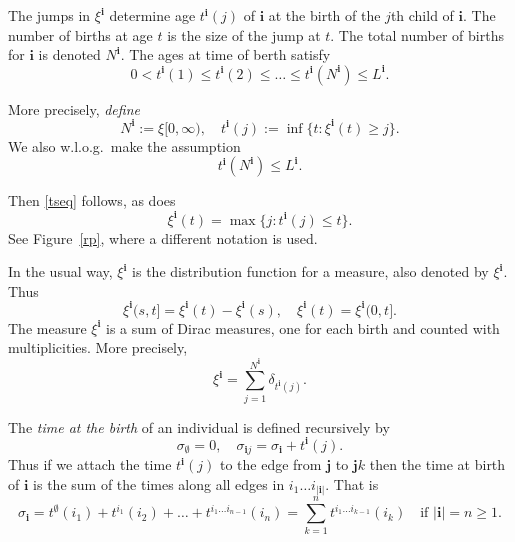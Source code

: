 \documentclass[a4paper]{amsart}
\theoremstyle{plain}
\theoremstyle{definition}
\theoremstyle{remark}
\begin{document}
The jumps in $ \xi ^ {\boldsymbol{i} } $ determine age $ t^{ \boldsymbol{i} }(j) $ of $ \boldsymbol{i} $ at the birth of   the $ j $th child of $ \boldsymbol{i} $. The number of births at age  $ t $ is the  size of the jump at $ t $. The  total number of births  for $ \boldsymbol{i} $ is denoted $ N^{ \boldsymbol{i} }$.  The   ages at time of berth  satisfy 
\begin{equation} \label{tseq}  
0 < t^{ \boldsymbol{i} }(1) \leq t^{ \boldsymbol{i} }(2) \leq \dots \leq  t^{ \boldsymbol{i} }(N^{ \boldsymbol{i} })\leq L^{ \boldsymbol{i} } .
\end{equation} 

More precisely,    \emph{define}
\begin{equation} \label{} 
N^{ \boldsymbol{i} } := \xi [0,\infty), \quad t^{ \boldsymbol{i} } (j) := \inf \{ t : \xi^ {\boldsymbol{i}  } (t) \geq j \}.
\end{equation} 
We also  w.l.o.g.\ make the assumption
\begin{equation} \label{} 
 t^{ \boldsymbol{i} }(N^{ \boldsymbol{i} }) \leq L^{ \boldsymbol{i} } .
\end{equation} 

Then \eqref{tseq} follows, as does
\begin{equation} \label{} 
\xi ^{ \boldsymbol{i} } (t) = \max \big\{ j : t^{ \boldsymbol{i} } (j) \leq t \big\}.
\end{equation} 
See Figure~\ref{rp}, where    a different notation is used.  

 
 In the usual way, $   \xi ^ { \boldsymbol{i}  } $  is the distribution function for a measure, also denoted by $    \xi ^ { \boldsymbol{i}  } $. 
Thus
\[
\xi ^ { \boldsymbol{i} } (s,t] = \xi ^ { \boldsymbol{i} } (t) - \xi ^ { \boldsymbol{i} } (s) ,  \quad \xi ^ { \boldsymbol{i} } (t) =  \xi ^ { \boldsymbol{i} } (0,t] .
\]
The measure $ \xi^ { \boldsymbol{i} } $ is a sum of Dirac measures, one for each birth and counted with multiplicities.  More precisely,
\begin{equation} \label{} 
\xi ^ { \boldsymbol{i} } = \sum_{j=1}^{ N^ { \boldsymbol{i} }} \delta _{ t^{ \boldsymbol{i} } (j) }.
\end{equation} 

\medskip The \emph{time  at the birth} of an individual is defined recursively by
\begin{equation} \label{} 
\sigma_{ \emptyset} = 0, \quad \sigma_{ \boldsymbol{i} j }  = \sigma _{ \boldsymbol{i} } + t^{ \boldsymbol{i} } (j).
\end{equation} 
Thus if we attach the time $ t^{ \boldsymbol{i} }(j) $ to the edge from $ \boldsymbol{j} $ to $ \boldsymbol{j} k $ then the time at birth of $ \boldsymbol{i} $ is the sum of the times along all edges in $ i_1\dots i _{ | \boldsymbol{i} |} $.  That is
\begin{equation} \label{tb} 
\sigma_{ \boldsymbol{i} } = t^{ \emptyset} (i_1) + t^{i_1}(i_2) + \dots + t^{i_1\dots i_{n-1} }(i_n) 
= \sum_{k=1}^n t^{ i_1\dots i_{k-1}}(i_k) 
\quad \text{if } | \boldsymbol{i} | = n \geq 1 .
\end{equation} 
\end{document}
